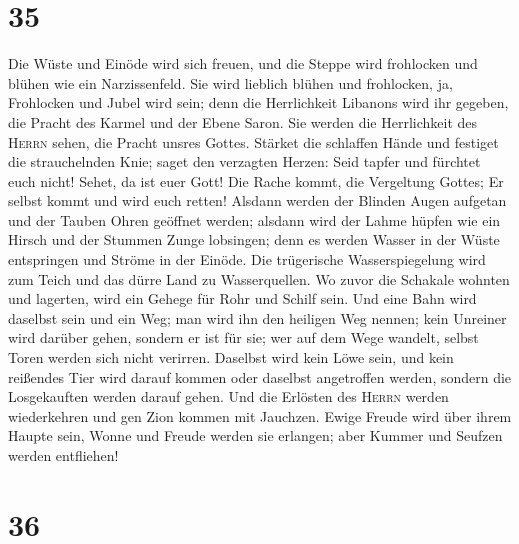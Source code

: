 \hypertarget{section-34}{%
\section{35}\label{section-34}}

 Die Wüste und Einöde wird sich freuen, und die Steppe
wird frohlocken und blühen wie ein Narzissenfeld.  Sie
wird lieblich blühen und frohlocken, ja, Frohlocken und Jubel wird sein;
denn die Herrlichkeit Libanons wird ihr gegeben, die Pracht des Karmel
und der Ebene Saron. Sie werden die Herrlichkeit des \textsc{Herrn}
sehen, die Pracht unsres Gottes.  Stärket die schlaffen
Hände und festiget die strauchelnden Knie;  saget den
verzagten Herzen: Seid tapfer und fürchtet euch nicht! Sehet, da ist
euer Gott! Die Rache kommt, die Vergeltung Gottes; Er selbst kommt und
wird euch retten!  Alsdann werden der Blinden Augen
aufgetan und der Tauben Ohren geöffnet werden;  alsdann
wird der Lahme hüpfen wie ein Hirsch und der Stummen Zunge lobsingen;
denn es werden Wasser in der Wüste entspringen und Ströme in der Einöde.
 Die trügerische Wasserspiegelung wird zum Teich und das
dürre Land zu Wasserquellen. Wo zuvor die Schakale wohnten und lagerten,
wird ein Gehege für Rohr und Schilf sein.  Und eine Bahn
wird daselbst sein und ein Weg; man wird ihn den heiligen Weg nennen;
kein Unreiner wird darüber gehen, sondern er ist für sie; wer auf dem
Wege wandelt, selbst Toren werden sich nicht verirren. 
Daselbst wird kein Löwe sein, und kein reißendes Tier wird darauf kommen
oder daselbst angetroffen werden, sondern die Losgekauften werden darauf
gehen.  Und die Erlösten des \textsc{Herrn} werden
wiederkehren und gen Zion kommen mit Jauchzen. Ewige Freude wird über
ihrem Haupte sein, Wonne und Freude werden sie erlangen; aber Kummer und
Seufzen werden entfliehen!

\hypertarget{section-35}{%
\section{36}\label{section-35}}

